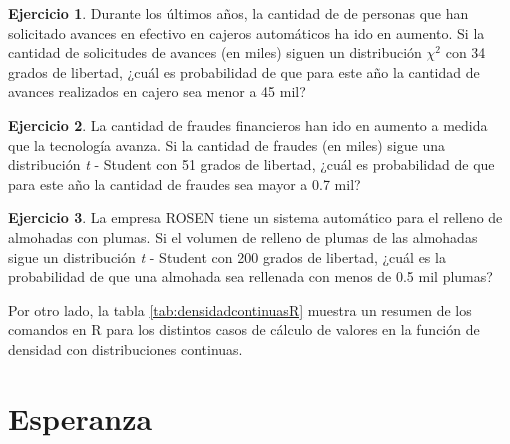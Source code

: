 \documentclass[
  11pt,
]{book}
\theoremstyle{definition}
\theoremstyle{definition}
\theoremstyle{definition}
\newtheorem{exercise}{Ejercicio}[chapter]
\theoremstyle{definition}
\theoremstyle{remark}
\begin{document}
\begin{exercise}
Durante los últimos años, la cantidad de de personas que han solicitado avances en efectivo en cajeros automáticos ha ido en aumento. Si la cantidad de solicitudes de avances (en miles) siguen un distribución \(\chi^2\) con 34 grados de libertad, ¿cuál es probabilidad de que para este año la cantidad de avances realizados en cajero sea menor a 45 mil?
\end{exercise}

\begin{exercise}
La cantidad de fraudes financieros han ido en aumento a medida que la tecnología avanza. Si la cantidad de fraudes (en miles) sigue una distribución \emph{t} - Student con 51 grados de libertad, ¿cuál es probabilidad de que para este año la cantidad de fraudes sea mayor a 0.7 mil?
\end{exercise}

\begin{exercise}
La empresa ROSEN tiene un sistema automático para el relleno de almohadas con plumas. Si el volumen de relleno de plumas de las almohadas sigue un distribución \emph{t} - Student con 200 grados de libertad, ¿cuál es la probabilidad de que una almohada sea rellenada con menos de 0.5 mil plumas?
\end{exercise}

Por otro lado, la tabla \ref{tab:densidadcontinuasR} muestra un resumen de los comandos en R para los distintos casos de cálculo de valores en la función de densidad con distribuciones continuas.

\begin{table}[H]
\centering
\caption{\label{tab:densidadcontinuasR}Cálculo de densidades de distribuciones continuas en R.}
\centering
{}
\end{table}

\section{Esperanza}\label{esperanza}
\end{document}
